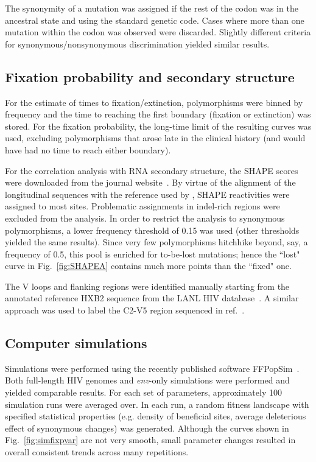 \documentclass[rmp, twocolumn]{revtex4}
\newcommand{\FIG}[1]{Fig.~\ref{fig:#1}}
\newcommand{\env}{\textit{env}}
\begin{document}
The synonymity of a mutation was assigned if the rest of the codon was
in the ancestral state and using the standard genetic code. Cases where more
than one mutation within the codon was observed were discarded. Slightly
different criteria for synonymous/nonsynonymous discrimination yielded similar
results.

\subsection{Fixation probability and secondary structure}
For the estimate of times to fixation/extinction, polymorphisms were
binned by frequency and the time to reaching the first boundary (fixation or
extinction) was stored. For the fixation probability, the long-time limit of the
resulting curves was used, excluding polymorphisms that arose late in the
clinical history (and would have had no time to reach either boundary).

For the correlation analysis with RNA secondary structure, the SHAPE scores were
downloaded from the journal website~\citep{watts_architecture_2009}. By virtue
of the alignment of the longitudinal sequences with the reference used by
\citet{watts_architecture_2009}, SHAPE reactivities were assigned to most sites.
Problematic assignments in indel-rich regions were excluded from the analysis.
In order to restrict the analysis to synonymous polymorphisms, a lower frequency
threshold of 0.15 was used (other thresholds yielded the same results). Since
very few polymorphisms hitchhike beyond, say, a frequency of 0.5, this pool is
enriched for to-be-lost mutations; hence the ``lost" curve in \FIG{SHAPEA}
contains much more points than the ``fixed" one.

The V loops and flanking regions were identified manually starting from the
annotated reference HXB2 sequence from the LANL HIV database~\citep{LANL2012}. A
similar approach was used to label the C2-V5 region sequenced in
ref.~\citep{shankarappa_consistent_1999}.

\subsection{Computer simulations}
Simulations were performed using the recently published software
FFPopSim~\citep{zanini_ffpopsim:_2012}. Both full-length HIV genomes and
\env{}-only simulations were performed and yielded comparable results. For each
set of parameters, approximately 100 simulation runs were averaged over. In each
run, a random fitness landscape with specified statistical properties (e.g.
density of beneficial sites, average deleterious effect of synonymous changes) was generated.
Although the curves shown in \FIG{simfixpvar} are not very smooth, small
parameter changes resulted in overall consistent trends across many repetitions.
\end{document}
